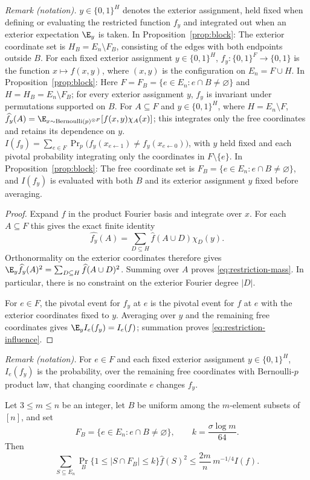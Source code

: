 \noindent\textit{Remark (notation).} $y\in\{0,1\}^{H}$ denotes the exterior assignment, held fixed when defining or evaluating the restricted function $f_y$ and integrated out when an exterior expectation $\E_y$ is taken. In Proposition~\ref{prop:block}: The exterior coordinate set is $H_B=E_n\setminus F_B$, consisting of the edges with both endpoints outside $B$. For each fixed exterior assignment $y\in\{0,1\}^{H}$, $f_y:\{0,1\}^{F}\to\{0,1\}$ is the function $x\mapsto f(x,y)$, where $(x,y)$ is the configuration on $E_n=F\cup H$. In Proposition~\ref{prop:block}: Here $F=F_B=\{e\in E_n:e\cap B\ne\varnothing\}$ and $H=H_B=E_n\setminus F_B$; for every exterior assignment $y$, $f_y$ is invariant under permutations supported on $B$. For $A\subseteq F$ and $y\in\{0,1\}^{H}$, where $H=E_n\setminus F$, $\widehat{f_y}(A)=\E_{x\sim\mathrm{Bernoulli}(p)^{\otimes F}}[f(x,y)\chi_A(x)]$; this integrates only the free coordinates and retains its dependence on $y$. $I(f_y)=\sum_{e\in F}\Pr_p\bigl(f_y(x_{e\leftarrow1})\ne f_y(x_{e\leftarrow0})\bigr)$, with $y$ held fixed and each pivotal probability integrating only the coordinates in $F\setminus\{e\}$. In Proposition~\ref{prop:block}: The free coordinate set is $F_B=\{e\in E_n:e\cap B\ne\varnothing\}$, and $I(f_y)$ is evaluated with both $B$ and its exterior assignment $y$ fixed before averaging.


\begin{proof}
Expand $f$ in the product Fourier basis and integrate over $x$.
For each $A\subseteq F$ this gives the exact finite identity
\[
 \widehat{f_y}(A)
 =\sum_{D\subseteq H}\widehat f(A\cup D)\chi_D(y).
\]
Orthonormality on the exterior coordinates therefore gives
$\E_y\widehat{f_y}(A)^2
=\sum_{D\subseteq H}\widehat f(A\cup D)^2$.
Summing over $A$ proves \eqref{eq:restriction-mass}.  In particular,
there is no constraint on the exterior Fourier degree $|D|$.

For $e\in F$, the pivotal event for $f_y$ at $e$ is the pivotal event
for $f$ at $e$ with the exterior coordinates fixed to $y$.  Averaging
over $y$ and the remaining free coordinates gives
$\E_y I_e(f_y)=I_e(f)$; summation proves
\eqref{eq:restriction-influence}.
\end{proof}

\noindent\textit{Remark (notation).} For $e\in F$ and each fixed exterior assignment $y\in\{0,1\}^{H}$, $I_e(f_y)$ is the probability, over the remaining free coordinates with Bernoulli-$p$ product law, that changing coordinate $e$ changes $f_y$.


\begin{proposition}
\label{prop:block}
Let $3\le m\le n$ be an integer, let $B$ be uniform among the
$m$-element subsets of $[n]$, and set
\[
 F_B=\{e\in E_n:e\cap B\ne\varnothing\},
 \qquad k=\frac{\sigma\log m}{64}.
\]
Then
\begin{equation}
 \sum_{S\subseteq E_n}
 \Pr_B\{1\le |S\cap F_B|\le k\}\widehat f(S)^2
 \le \frac{2m}{n}\,m^{-1/4}I(f).
 \label{eq:block-average}
\end{equation}
\end{proposition}

